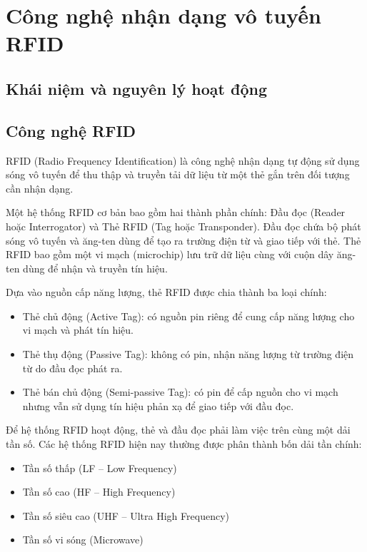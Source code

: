 \documentclass[12pt,a4paper]{report}
\begin{document}
\section{Công nghệ nhận dạng vô tuyến RFID}

\subsection{Khái niệm và nguyên lý hoạt động}

\subsection{Công nghệ RFID}

RFID (Radio Frequency Identification) là công nghệ nhận dạng tự động sử dụng sóng vô tuyến để thu thập và truyền tải dữ liệu từ một thẻ gắn trên đối tượng cần nhận dạng.

Một hệ thống RFID cơ bản bao gồm hai thành phần chính: Đầu đọc (Reader hoặc Interrogator) và Thẻ RFID (Tag hoặc Transponder). Đầu đọc chứa bộ phát sóng vô tuyến và ăng-ten dùng để tạo ra trường điện từ và giao tiếp với thẻ. Thẻ RFID bao gồm một vi mạch (microchip) lưu trữ dữ liệu cùng với cuộn dây ăng-ten dùng để nhận và truyền tín hiệu.

Dựa vào nguồn cấp năng lượng, thẻ RFID được chia thành ba loại chính:
\begin{itemize}
    \item Thẻ chủ động (Active Tag): có nguồn pin riêng để cung cấp năng lượng cho vi mạch và phát tín hiệu.
    \item Thẻ thụ động (Passive Tag): không có pin, nhận năng lượng từ trường điện từ do đầu đọc phát ra.
    \item Thẻ bán chủ động (Semi-passive Tag): có pin để cấp nguồn cho vi mạch nhưng vẫn sử dụng tín hiệu phản xạ để giao tiếp với đầu đọc.
\end{itemize}

Để hệ thống RFID hoạt động, thẻ và đầu đọc phải làm việc trên cùng một dải tần số. Các hệ thống RFID hiện nay thường được phân thành bốn dải tần chính:
\begin{itemize}
    \item Tần số thấp (LF – Low Frequency)
    \item Tần số cao (HF – High Frequency)
    \item Tần số siêu cao (UHF – Ultra High Frequency)
    \item Tần số vi sóng (Microwave)
\end{itemize}
\end{document}
